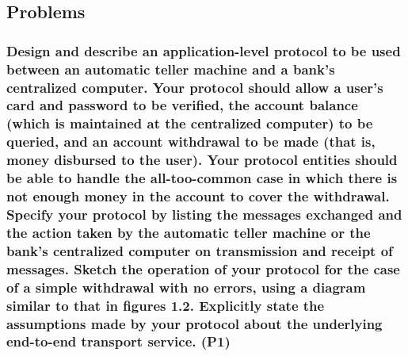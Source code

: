 \subsection{Problems}

\subsubsection{Design and describe an application-level protocol to be used between an automatic teller machine and a bank's centralized computer. Your protocol should allow a user's card and password to be verified, the account balance (which is maintained at the centralized computer) to be queried, and an account withdrawal to be made (that is, money disbursed to the user). Your protocol entities should be able to handle the all-too-common case in which there is not enough money in the account to cover the withdrawal. Specify your protocol by listing the messages exchanged and the action taken by the automatic teller machine or the bank's centralized computer on transmission and receipt of messages. Sketch the operation of your protocol for the case of a simple withdrawal with no errors, using a diagram similar to that in figures 1.2. Explicitly state the assumptions made by your protocol about the underlying end-to-end transport service. (P1)}

